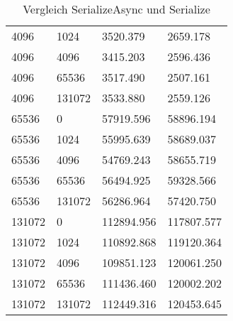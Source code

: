 \begin{table}[h]
\begin{tabular}{@{}llll@{}}
    4096                & 1024                  & 3520.379                                        & 2659.178                                   \\
    4096                & 4096                  & 3415.203                                        & 2596.436                                   \\
    4096                & 65536                 & 3517.490                                        & 2507.161                                   \\
    4096                & 131072                & 3533.880                                        & 2559.126                                   \\
    65536               & 0                     & 57919.596                                       & 58896.194                                  \\
    65536               & 1024                  & 55995.639                                       & 58689.037                                  \\
    65536               & 4096                  & 54769.243                                       & 58655.719                                  \\
    65536               & 65536                 & 56494.925                                       & 59328.566                                  \\
    65536               & 131072                & 56286.964                                       & 57420.750                                  \\
    131072              & 0                     & 112894.956                                      & 117807.577                                 \\
    131072              & 1024                  & 110892.868                                      & 119120.364                                 \\
    131072              & 4096                  & 109851.123                                      & 120061.250                                 \\
    131072              & 65536                 & 111436.460                                      & 120002.202                                 \\
    131072              & 131072                & 112449.316                                      & 120453.645                                 \\ \bottomrule
    \end{tabular}%
    \caption{Vergleich SerializeAsync und Serialize}
    \label{tab:vergleich-serialize-async-serialize}
\end{table}

